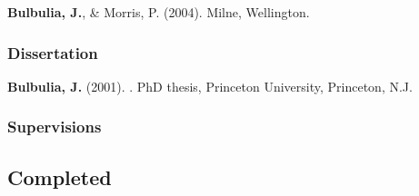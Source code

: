 \documentclass{article}
\begin{document}
\begin{thebibliography}{99}
{\bf Bulbulia, J.}, \& Morris, P. (2004).
\newblock Milne, Wellington.


\subsubsection*{Dissertation} 
{\bf Bulbulia, J.} (2001).
.
\newblock PhD thesis, Princeton University, Princeton, N.J.  %


\end{thebibliography}


\subsubsection*{Supervisions}
\subsection*{Completed}
\noindent
\end{document}
